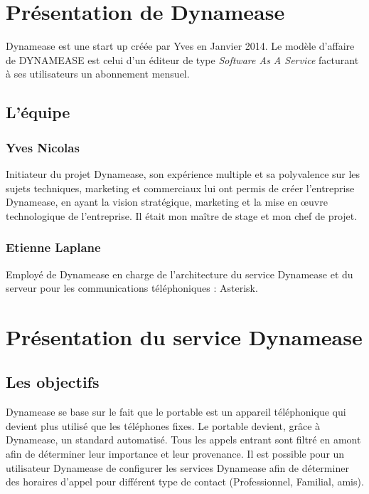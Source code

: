 \section{Présentation de Dynamease}

Dynamease est une start up créée par Yves  en Janvier 2014. Le modèle d'affaire de DYNAMEASE est celui d’un éditeur de type \textit{Software As A Service} facturant à ses utilisateurs un abonnement mensuel.

\subsection{L'équipe} 

\subsubsection{Yves Nicolas}

Initiateur du projet Dynamease, son expérience multiple et sa polyvalence sur les sujets techniques, marketing et commerciaux lui ont permis de créer l’entreprise Dynamease, en ayant la vision stratégique, marketing et la mise en œuvre technologique de l’entreprise. Il était mon maître de stage et mon chef de projet.

\subsubsection{Etienne Laplane}

Employé de Dynamease en charge de l’architecture du service Dynamease et du serveur pour les communications téléphoniques : Asterisk.


\section{Présentation du service Dynamease}

\subsection{Les objectifs}

Dynamease se base sur le fait que le portable est un appareil téléphonique qui devient plus utilisé que les téléphones fixes. Le portable devient, grâce à Dynamease, un standard automatisé. Tous les appels entrant sont filtré en amont afin de déterminer leur importance et leur provenance. Il est possible pour un utilisateur Dynamease de configurer les services Dynamease afin de déterminer des horaires d'appel pour différent type de contact (Professionnel, Familial, amis).

